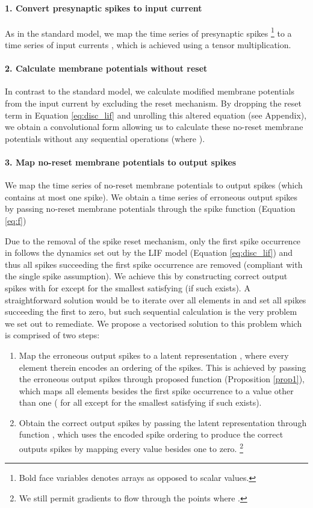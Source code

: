 \documentclass{article} \usepackage{iclr2023_conference,times}
\begin{document}
\paragraph{1. Convert presynaptic spikes to input current} As in the standard model, we map the time series of presynaptic spikes  \footnote{Bold face variables denotes arrays as opposed to scalar values.} to a time series of input currents , which is achieved using a tensor multiplication.

\paragraph{2. Calculate membrane potentials without reset} In contrast to the standard model, we calculate modified membrane potentials  from the input current  by excluding the reset mechanism. By dropping the reset term  in Equation \ref{eq:disc_lif} and unrolling this altered equation (see Appendix), we obtain a convolutional form allowing us to calculate these no-reset membrane potentials  without any sequential operations (where ).

\paragraph{3. Map no-reset membrane potentials to output spikes} We map the time series of no-reset membrane potentials  to output spikes  (which contains at most one spike). We obtain a time series of erroneous output spikes  by passing no-reset membrane potentials  through the spike function  (Equation \ref{eq:f})

Due to the removal of the spike reset mechanism, only the first spike occurrence in  follows the dynamics set out by the LIF model (Equation \ref{eq:disc_lif}) and thus all spikes succeeding the first spike occurrence are removed (compliant with the single spike assumption). We achieve this by constructing correct output spikes  with  for  except  for the smallest  satisfying  (if such  exists). A straightforward solution would be to iterate over all elements in  and set all spikes succeeding the first to zero, but such sequential calculation is the very problem we set out to remediate. We propose a vectorised solution to this problem which is comprised of two steps: 

\begin{enumerate}
	\item Map the erroneous output spikes  to a latent representation , where every element therein encodes an ordering of the spikes. This is achieved by passing the erroneous output spikes  through proposed function  (Proposition \ref{prop1}), which maps all elements besides the first spike occurrence to a value other than one ( for all  except for the smallest  satisfying  if such  exists). \item Obtain the correct output spikes  by passing the latent representation  through function , which uses the encoded spike ordering to produce the correct outputs spikes  by mapping every value besides one to zero. \footnote{We still permit gradients to flow through the points where .}
 
\end{enumerate}
\end{document}

